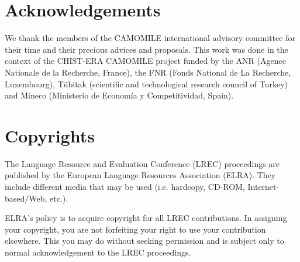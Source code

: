 \documentclass[10pt, a4paper]{article}
\begin{document}
\section{Acknowledgements}

We thank the members of the CAMOMILE international advisory committee for their time and their precious advices and proposals. This work was done in the context of the CHIST-ERA CAMOMILE project funded by the ANR (Agence Nationale de la Recherche, France), the FNR (Fonds National de La Recherche, Luxembourg), Tübitak (scientific and technological research council of Turkey) and Mineco (Ministerio de Economía y Competitividad, Spain).


\section{Copyrights}

The Lan\-gua\-ge Re\-sour\-ce and Evalua\-tion Con\-fe\-rence (LREC) proceedings are published by the European Language Resources Association (ELRA). They include different media that may be used (i.e. hardcopy, CD-ROM, Internet-based/Web, etc.).

ELRA's policy is to acquire copyright for all LREC contributions. In assigning your copyright, you are not forfeiting your right to use your contribution elsewhere.  This you may do without seeking permission and is subject only to normal acknowledgement to the LREC proceedings.




\end{document}
